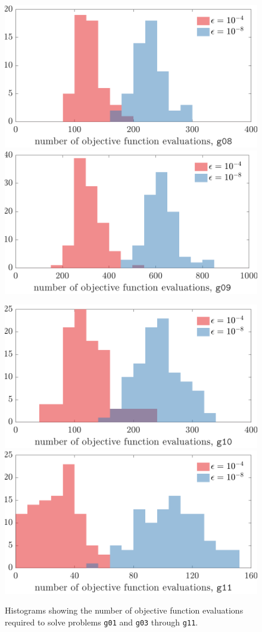 \documentclass[oribibl]{llncs}
\begin{document}
\begin{figure}
\begin{minipage}{\linewidth}
    \vspace{3.6mm}
    
    \includegraphics[width=.48\linewidth]{figures/hist08}
    \hfill
    \includegraphics[width=.48\linewidth]{figures/hist09}
    
    \vspace{3.6mm}
    
    \includegraphics[width=.48\linewidth]{figures/hist10}
    \hfill
    \includegraphics[width=.48\linewidth]{figures/hist11}      
  \end{minipage}
  \caption{\label{fig.histograms}Histograms showing the number of objective function evaluations required to solve problems \texttt{g01} and \texttt{g03} through \texttt{g11}.}
\end{figure}
\end{document}
